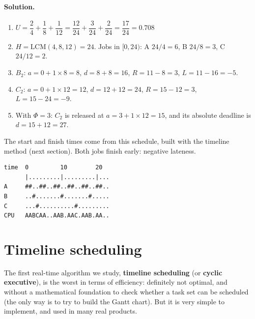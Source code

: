 \paragraph{Solution.}
\begin{enumerate}
    \item $U = \dfrac{2}{4} + \dfrac{1}{8} + \dfrac{1}{12} = \dfrac{12}{24} + \dfrac{3}{24} + \dfrac{2}{24} = \dfrac{17}{24} = 0.708$
    \item $H = \mathrm{LCM}(4, 8, 12) = 24$. Jobs in $[0, 24)$: A $24/4 = 6$, B $24/8 = 3$, C $24/12 = 2$.
    \item $B_2$: $a = 0 + 1 \times 8 = 8$, \quad $d = 8 + 8 = 16$, \quad $R = 11 - 8 = 3$, \quad $L = 11 - 16 = -5$.
    \item $C_2$: $a = 0 + 1 \times 12 = 12$, \quad $d = 12 + 12 = 24$, \quad $R = 15 - 12 = 3$, \quad $L = 15 - 24 = -9$.
    \item With $\Phi = 3$: $C_2$ is released at $a = 3 + 1 \times 12 = 15$, and its absolute deadline is $d = 15 + 12 = 27$.
\end{enumerate}
The start and finish times come from this schedule, built with the timeline method (next section). Both jobs finish early: negative lateness.
\begin{verbatim}
time  0         10        20
      |.........|.........|...
A     ##..##..##..##..##..##..
B     ..#.......#.......#.....
C     ...#..........#.........
CPU   AABCAA..AAB.AAC.AAB.AA..
\end{verbatim}

\section{Timeline scheduling}
The first real-time algorithm we study, \textbf{timeline scheduling} (or \textbf{cyclic executive}), is the worst in terms of efficiency: definitely not optimal, and without a mathematical foundation to check whether a task set can be scheduled (the only way is to try to build the Gantt chart). But it is very simple to implement, and used in many real products.

